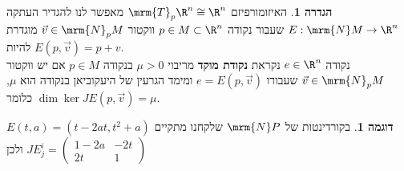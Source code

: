 \documentclass{article}
\theoremstyle{definition}
\newtheorem*{definition*}{הגדרה}
\newtheorem*{example*}{דוגמה}
\begin{document}
	\begin{definition*}
		האיזומורפיזם
		\(\mrm{T}_p \R^n \cong \R^n\)
		מאפשר לנו להגדיר העתקה
		\(E:\mrm{N} M \to \R^n\)
		שעבור נקודה
		\(p \in M \subset \R^n\)
		ווקטור
		\(\vec{v} \in \mrm{N}_p M\)
		מוגדרת להיות
		\(E(p,\vec{v})=p+v\).
		\\
		נקודה
		\(e \in \R^n\)
		נקראת \textbf{נקודת מוקד} מריבוי
		\(\mu>0\)
		בנקודה
		\(p \in M\)
		אם יש ווקטור
		\(\vec{v} \in \mrm{N}_p M\)
		שעבורו
		\(e = E(p,\vec{v})\)
		ומימד הגרעין של היעקוביאן בנקודה הוא \(\mu\), כלומר
		\(\dim \ker JE(p,\vec{v}) = \mu\).
	\end{definition*}

	\begin{example*}
		בקורדינטות של
		\(\mrm{N} P\)
		שלקחנו מתקיים
		\(
			E(t,a) = (t-2at,t^2+a)
		\)
		ולכן
		\(
			{JE}^i_j = \begin{pmatrix}
				1-2a & -2t
				\\
				2t & 1
			\end{pmatrix}
		\)
	\end{example*}
\end{document}
